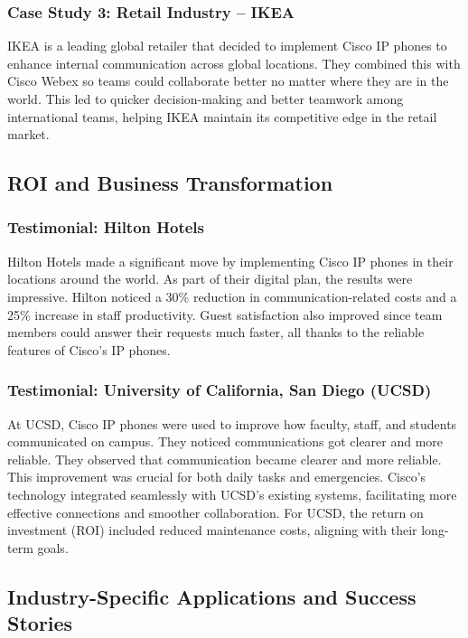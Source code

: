 \documentclass[11pt,a4paper]{article}
\begin{document}
\subsubsection*{Case Study 3: Retail Industry – IKEA}

IKEA is a leading global retailer that decided to implement Cisco IP phones to enhance internal communication across global locations. They combined this with Cisco Webex so teams could collaborate better no matter where they are in the world. This led to quicker decision-making and better teamwork among international teams, helping IKEA maintain its competitive edge in the retail market.


\subsection*{ROI and Business Transformation}

\subsubsection*{Testimonial: Hilton Hotels}

Hilton Hotels made a significant move by implementing Cisco IP phones in their locations around the world. As part of their digital plan, the results were impressive. Hilton noticed a 30\% reduction in communication-related costs and a 25\% increase in staff productivity. Guest satisfaction also improved since team members could answer their requests much faster, all thanks to the reliable features of Cisco’s IP phones.


\subsubsection*{Testimonial: University of California, San Diego (UCSD)}

At UCSD, Cisco IP phones were used to improve how faculty, staff, and students communicated on campus. They noticed communications got clearer and more reliable. They observed that communication became clearer and more reliable. This improvement was crucial for both daily tasks and emergencies. Cisco's technology integrated seamlessly with UCSD’s existing systems, facilitating more effective connections and smoother collaboration. For UCSD, the return on investment (ROI) included reduced maintenance costs, aligning with their long-term goals.

\subsection*{Industry-Specific Applications and Success Stories}
\end{document}
